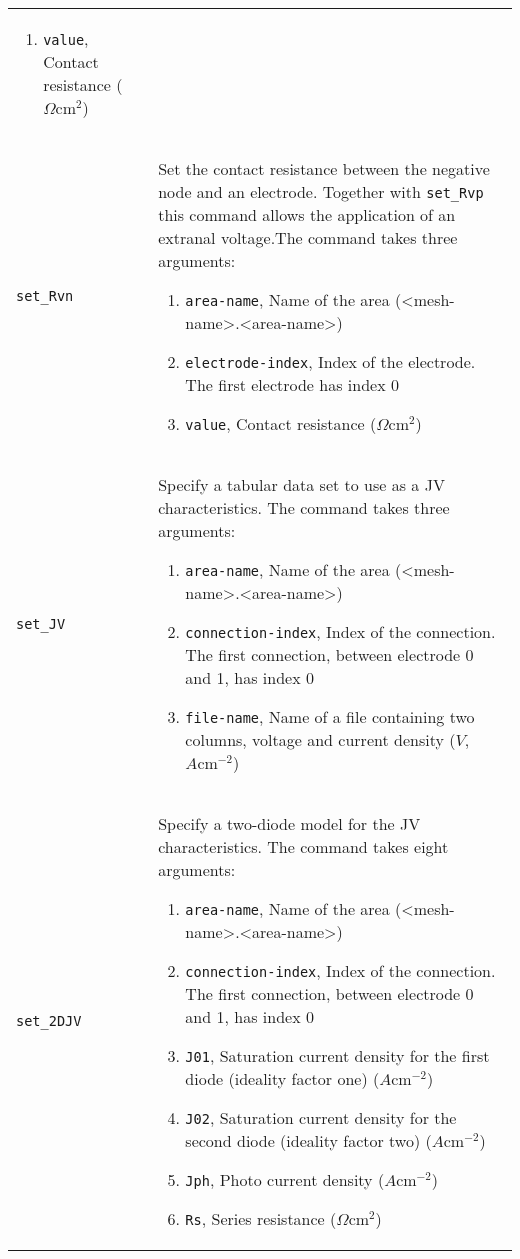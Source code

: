 \documentclass[noshowpacs,preprintnumbers,amsmath,amssymb, letter]{revtex4}
\begin{document}
\begin{longtable}{p{}p{}}
\begin{enumerate}
\item \texttt{value}, Contact resistance ($\Omega \text{cm}^2$)
\end{enumerate}\\
\texttt{set\_Rvn}	&  Set the contact resistance between the negative node and an electrode. Together with \texttt{set\_Rvp} this command allows the application of an extranal voltage.The command takes three arguments:
\begin{enumerate}
\item \texttt{area-name}, Name of the area (\textless mesh-name\textgreater .\textless area-name\textgreater )
\item \texttt{electrode-index}, Index of the electrode. The first electrode has index 0
\item \texttt{value}, Contact resistance ($\Omega \text{cm}^2$)
\end{enumerate}\\
\texttt{set\_JV}	&  Specify a tabular data set to use as a JV characteristics. The command takes three arguments:
\begin{enumerate}
\item \texttt{area-name}, Name of the area (\textless mesh-name\textgreater .\textless area-name\textgreater )
\item \texttt{connection-index}, Index of the connection. The first connection, between electrode 0 and 1,  has index 0
\item \texttt{file-name}, Name of a file containing two columns, voltage and current density ($V$, $A \text{cm}^{-2}$)
\end{enumerate}\\
\texttt{set\_2DJV}	&  Specify a two-diode model for the JV characteristics. The command takes eight arguments:
\begin{enumerate}
\item \texttt{area-name}, Name of the area (\textless mesh-name\textgreater .\textless area-name\textgreater )
\item \texttt{connection-index}, Index of the connection. The first connection, between electrode 0 and 1,  has index 0
\item \texttt{J01}, Saturation current density for the first diode (ideality factor one)  ($A \text{cm}^{-2}$)
\item \texttt{J02}, Saturation current density for the second diode (ideality factor two)  ($A \text{cm}^{-2}$)
\item \texttt{Jph}, Photo current density ($A \text{cm}^{-2}$)
\item \texttt{Rs}, Series resistance ($\Omega \text{cm}^2$)

\end{enumerate}
\end{longtable}
\end{document}
